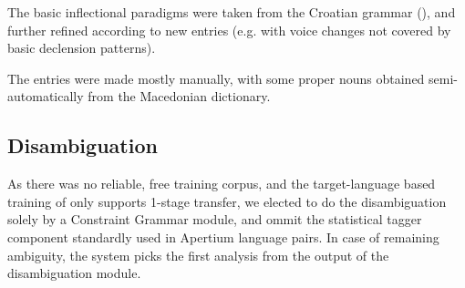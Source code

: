 \documentclass{book}
\begin{document}
The basic inflectional paradigms were taken from the Croatian grammar (\citealp{baric1997hrvatska}), 
and further refined according to new entries (e.g. with voice changes not covered by basic declension
patterns).

The entries were made mostly manually, with some proper nouns obtained semi-automatically from the Macedonian
dictionary.

\subsection*{Disambiguation}
As there was no reliable, free training corpus, and the target-language 
based training of \cite{sanchez2008using} only supports 1-stage transfer, we elected 
to do the disambiguation solely by a Constraint Grammar module, and ommit the
statistical tagger component standardly used in Apertium language pairs. In case of remaining 
ambiguity, the system picks the first analysis from the output of the disambiguation 
module.


\end{document}
